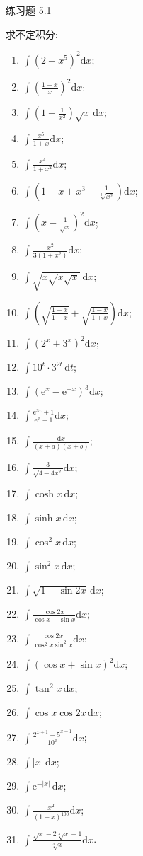 \begin{exblock}{练习题 5.1}
  \item 求不定积分:
  \begin{enumerate}[label=(\arabic*)]
    \item $\int(2+x^{5})^{2}\mathrm{d}x$;
    \item $\int\left(\frac{1-x}{x}\right)^{2}\mathrm{d}x$;
    \item $\int\left(1-\frac{1}{x^{2}}\right)\sqrt{x}\,\mathrm{d}x$;
    \item $\int\frac{x^{5}}{1+x}\mathrm{d}x$;
    \item $\int\frac{x^{4}}{1+x^{2}}\mathrm{d}x$;
    \item $\int\left(1-x+x^{3}-\frac{1}{\sqrt[3]{x^{2}}}\right)\mathrm{d}x$;
    \item $\int\left(x-\frac{1}{\sqrt{x}}\right)^{2}\mathrm{d}x$;
    \item $\int\frac{x^{2}}{3(1+x^{2})}\mathrm{d}x$;
    \item $\int\sqrt{x\sqrt{x\sqrt{x}}}\,\mathrm{d}x$;
    \item $\int\left(\sqrt{\frac{1+x}{1-x}}+\sqrt{\frac{1-x}{1+x}}\right)\mathrm{d}x$;
    \item $\int(2^{x}+3^{x})^{2}\mathrm{d}x$;
    \item $\int 10^{t}\cdot 3^{2t}\,\mathrm{d}t$;
    \item $\int(\mathrm{e}^{x}-\mathrm{e}^{-x})^{3}\mathrm{d}x$;
    \item $\int\frac{\mathrm{e}^{3x}+1}{\mathrm{e}^{x}+1}\mathrm{d}x$;
    \item $\int\frac{\mathrm{d}x}{(x+a)(x+b)}$;
    \item $\int\frac{3}{\sqrt{4-4x^{2}}}\mathrm{d}x$;
    \item $\int\cosh x\,\mathrm{d}x$;
    \item $\int\sinh x\,\mathrm{d}x$;
    \item $\int\cos^{2}x\,\mathrm{d}x$;
    \item $\int\sin^{2}x\,\mathrm{d}x$;
    \item $\int\sqrt{1-\sin 2x}\,\mathrm{d}x$;
    \item $\int\frac{\cos 2x}{\cos x-\sin x}\mathrm{d}x$;
    \item $\int\frac{\cos 2x}{\cos^{2}x\sin^{2}x}\mathrm{d}x$;
    \item $\int(\cos x+\sin x)^{2}\mathrm{d}x$;
    \item $\int\tan^{2}x\,\mathrm{d}x$;
    \item $\int\cos x\cos 2x\,\mathrm{d}x$;
    \item $\int\frac{2^{x+1}-5^{x-1}}{10^{x}}\mathrm{d}x$;
    \item $\int|x|\,\mathrm{d}x$;
    \item $\int\mathrm{e}^{-|x|}\,\mathrm{d}x$;
    \item $\int\frac{x^{2}}{(1-x)^{100}}\mathrm{d}x$;
    \item $\int\frac{\sqrt{x}-2\sqrt[3]{x}-1}{\sqrt[4]{x}}\mathrm{d}x$.
  \end{enumerate}


\end{exblock}
